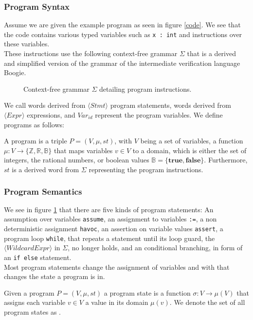 \subsubsection{Program Syntax}
Assume we are given the example program as seen in figure \ref{code}. We see that the code contains various typed variables such as \texttt{x : int} and instructions over these variables. \\ These instructions use the following context-free grammar $\Sigma$ that is a derived and simplified version of the grammar of the intermediate verification language Boogie\cite{Boogie}.
\setlength{\grammarparsep}{20pt plus 1pt minus 1pt} %
\setlength{\grammarindent}{12em} %
\begin{figure}[H]
	
	\caption{Context-free grammar $\Sigma$ detailing program instructions.}
	\label{grmr}
\end{figure}
We call words derived from $\langle Stmt \rangle$ program statements, words derived from $\langle Expr \rangle$ expressions, and $Var_{id}$ represent the program variables.
We define programs as follows:

\begin{mydef}[Programs]
	A program is a triple $P = (V, \mu, st)$, with $V$ being a set of variables, a function $\mu: V \rightarrow \{ \mathbb{Z}, \mathbb{R}, \mathbb{B} \}$ that maps variables $v \in V$ to a domain, which is either the set of integers, the rational numbers, or boolean values $\mathbb{B} = \{\textbf{true}, \textbf{false}\}$. Furthermore, $st$ is a derived word from $\Sigma$ representing the program instructions.
\end{mydef}
\subsubsection{Program Semantics}
We see in figure \ref{grmr} that there are five kinds of program statements: An assumption over variables \texttt{assume}, an assignment to variables \texttt{:=}, a non deterministic assignment \texttt{havoc}, an assertion on variable values \texttt{assert}, a program loop \texttt{while}, that repeats a statement until its loop guard, the $\langle WildcardExpr \rangle$ in $\Sigma$, no longer holds, and an conditional branching, in form of an \texttt{if else} statement. \\
Most program statements change the assignment of variables and with that changes the state a program is in. 
\begin{mydef}
	Given a program $P = (V, \mu, st)$ a program state is a function $\sigma: V \rightarrow \mu(V)$ that assigns each variable $v \in V$ a value in its domain $\mu(v)$. We denote the set of all program states as \stateSpace.
\end{mydef}


